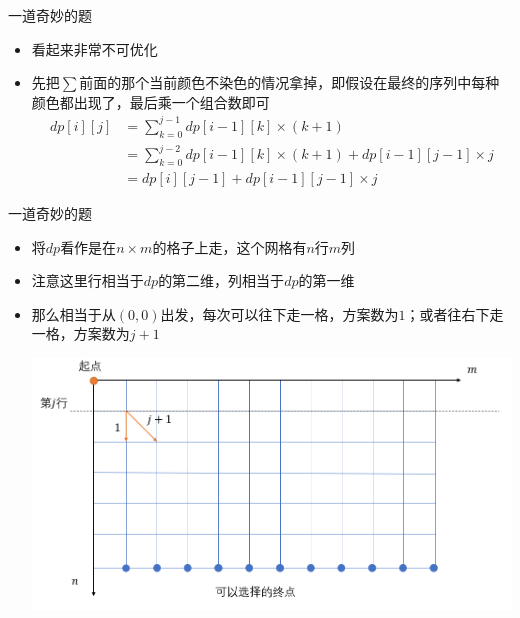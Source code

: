\documentclass{beamer}
\begin{document}
\begin{frame}{一道奇妙的题}
    \begin{itemize}
        \item 看起来非常不可优化 \pause
        \item 先把$\sum$前面的那个当前颜色不染色的情况拿掉，即假设在最终的序列中每种颜色都出现了，最后乘一个组合数即可 \pause
        $$\begin{aligned}
            dp[i][j] &= \sum_{k = 0}^{j - 1} dp[i - 1][k]\times (k + 1)\\
            &= \sum_{k = 0}^{j - 2} dp[i - 1][k]\times (k + 1) + dp[i - 1][j - 1]\times j\\
            &= dp[i][j - 1] + dp[i - 1][j - 1] \times j
        \end{aligned}$$
    \end{itemize}
\end{frame}

\begin{frame}{一道奇妙的题}
    \begin{itemize}
        \item 将$dp$看作是在$n\times m$的格子上走，这个网格有$n$行$m$列 \pause
        \item 注意这里行相当于$dp$的第二维，列相当于$dp$的第一维 \pause
        \item 那么相当于从$(0,0)$出发，每次可以往下走一格，方案数为$1$；或者往右下走一格，方案数为$j+1$ \pause
        \begin{center}
            \includegraphics[scale = 0.25]{1.png}
        \end{center}
    \end{itemize}
\end{frame} 
\end{document}
